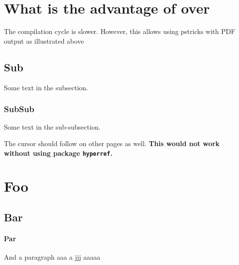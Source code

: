 \documentclass{article}
\begin{document}
\section {What is the advantage of
\protect {}
\protect{} 
over \protect{}}

The compilation cycle is slower. However, this allows using pstricks
with PDF output as illustrated above 
 
\subsection {Sub}

Some text in the subsection. 

\subsubsection {SubSub} 

Some text in the sub-subsection. 

\newpage

The cursor should follow on other pages as well. 
\textbf{This would not work without 
using package \texttt{hyperref}.}



\section{Foo}

\subsection {Bar}

\paragraph {Par}

And a paragraph aaa a jjj aaaaa
\end{document}

